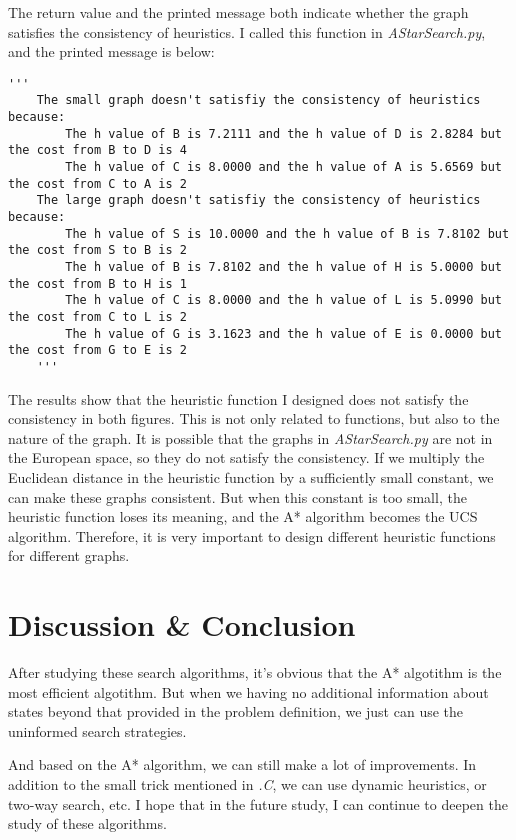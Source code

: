 \documentclass[aps,letterpaper,10pt]{revtex4}
\newcommand{\RNum}[1]{\uppercase\expandafter{\romannumeral #1\relax}}
\begin{document}
\newpage
The return value and the printed message both indicate whether the graph satisfies the consistency of heuristics.
I called this function in \emph{AStarSearch.py}, and the printed message is below:
\begin{lstlisting}[style = python]
	'''
	The small graph doesn't satisfiy the consistency of heuristics because:
		The h value of B is 7.2111 and the h value of D is 2.8284 but the cost from B to D is 4
		The h value of C is 8.0000 and the h value of A is 5.6569 but the cost from C to A is 2
	The large graph doesn't satisfiy the consistency of heuristics because:
		The h value of S is 10.0000 and the h value of B is 7.8102 but the cost from S to B is 2
		The h value of B is 7.8102 and the h value of H is 5.0000 but the cost from B to H is 1
		The h value of C is 8.0000 and the h value of L is 5.0990 but the cost from C to L is 2
		The h value of G is 3.1623 and the h value of E is 0.0000 but the cost from G to E is 2
	'''
\end{lstlisting}

The results show that the heuristic function I designed does not satisfy the consistency in both figures. 
This is not only related to functions, but also to the nature of the graph. 
It is possible that the graphs in \emph{AStarSearch.py} are not in the European space, so they do not satisfy the consistency. 
If we multiply the Euclidean distance in the heuristic function by a sufficiently small constant, we can make these graphs consistent. 
But when this constant is too small, the heuristic function loses its meaning, and the A* algorithm becomes the UCS algorithm.
Therefore, it is very important to design different heuristic functions for different graphs.





\newpage
\section{Discussion \& Conclusion}
After studying these search algorithms, it's obvious that the A* algotithm is the most efficient algotithm.
But when we having no additional information about states beyond that provided in the problem definition, we just can use the uninformed search strategies.

And based on the A* algorithm, we can still make a lot of improvements. 
In addition to the small trick mentioned in \emph{\RNum{2}.C}, we can use dynamic heuristics, or two-way search, etc.
I hope that in the future study, I can continue to deepen the study of these algorithms.
\end{document}
